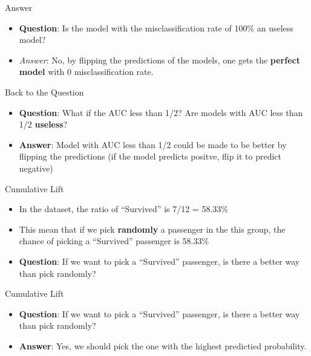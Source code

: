 \documentclass[
  ignorenonframetext,
]{beamer}
\providecommand{\tightlist}{%
  \setlength{\itemsep}{0pt}\setlength{\parskip}{0pt}}
\begin{document}
\begin{frame}{Answer}
\protect\hypertarget{answer}{}
\begin{itemize}
\tightlist
\item
  \textbf{Question}: Is the model with the misclassification rate of
  100\% an useless model?
\item
  \emph{Answer}: No, by flipping the predictions of the models, one gets
  the \textbf{perfect model} with 0 misclassification rate.
\end{itemize}
\end{frame}

\begin{frame}{Back to the Question}
\protect\hypertarget{back-to-the-question}{}
\begin{itemize}
\item
  \textbf{Question}: What if the AUC less than 1/2? Are models with AUC
  less than 1/2 \textbf{useless}?
\item
  \textbf{Answer}: Model with AUC less than 1/2 could be made to be
  better by flipping the predictions (if the model predicts positve,
  flip it to predict negative)
\end{itemize}
\end{frame}

\begin{frame}{Cumulative Lift}
\protect\hypertarget{cumulative-lift}{}
\begin{itemize}
\tightlist
\item
  In the dataset, the ratio of ``Survived'' is 7/12 = 58.33\%
\item
  This mean that if we pick \textbf{randomly} a passenger in the this
  group, the chance of picking a ``Survived'' passenger is 58.33\%
\item
  \textbf{Question}: If we want to pick a ``Survived'' passenger, is
  there a better way than pick randomly?
\end{itemize}
\end{frame}

\begin{frame}{Cumulative Lift}
\protect\hypertarget{cumulative-lift-1}{}
\begin{itemize}
\tightlist
\item
  \textbf{Question}: If we want to pick a ``Survived'' passenger, is
  there a better way than pick randomly?
\item
  \textbf{Answer}: Yes, we should pick the one with the highest
  predictied probability.
\end{itemize}
\end{frame}
\end{document}
